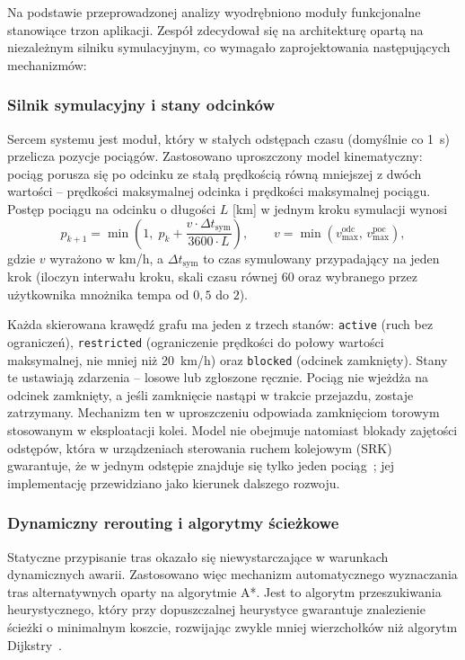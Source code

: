 \documentclass[twoside]{projektInzynierskiMS1z}
\begin{document}
Na podstawie przeprowadzonej analizy wyodrębniono moduły funkcjonalne stanowiące trzon
aplikacji. Zespół zdecydował się na architekturę opartą na niezależnym silniku
symulacyjnym, co wymagało zaprojektowania następujących mechanizmów:

\subsubsection{Silnik symulacyjny i stany odcinków}

Sercem systemu jest moduł, który w stałych odstępach czasu (domyślnie co 1~s)
przelicza pozycje pociągów. Zastosowano uproszczony model kinematyczny: pociąg
porusza się po odcinku ze stałą prędkością równą mniejszej z dwóch wartości --
prędkości maksymalnej odcinka i prędkości maksymalnej pociągu. Postęp pociągu na
odcinku o długości $L$ [km] w jednym kroku symulacji wynosi
\begin{equation}
p_{k+1} = \min\left(1,\; p_k + \frac{v \cdot \Delta t_{\mathrm{sym}}}{3600 \cdot L}\right),
\qquad v = \min\left(v^{\mathrm{odc}}_{\max},\, v^{\mathrm{poc}}_{\max}\right),
\end{equation}
gdzie $v$ wyrażono w km/h, a $\Delta t_{\mathrm{sym}}$ to czas symulowany
przypadający na jeden krok (iloczyn interwału kroku, skali czasu równej 60 oraz
wybranego przez użytkownika mnożnika tempa od $0{,}5$ do $2$).

Każda skierowana krawędź grafu ma jeden z trzech stanów: \texttt{active} (ruch
bez ograniczeń), \texttt{restricted} (ograniczenie prędkości do połowy wartości
maksymalnej, nie mniej niż 20~km/h) oraz \texttt{blocked} (odcinek zamknięty).
Stany te ustawiają zdarzenia -- losowe lub zgłoszone ręcznie. Pociąg nie wjeżdża
na odcinek zamknięty, a jeśli zamknięcie nastąpi w trakcie przejazdu, zostaje
zatrzymany. Mechanizm ten w uproszczeniu odpowiada zamknięciom torowym stosowanym
w eksploatacji kolei. Model nie obejmuje natomiast blokady zajętości odstępów,
która w urządzeniach sterowania ruchem kolejowym (SRK) gwarantuje, że w jednym
odstępie znajduje się tylko jeden pociąg~\cite{srk}; jej implementację
przewidziano jako kierunek dalszego rozwoju.

\subsubsection{Dynamiczny rerouting i algorytmy ścieżkowe}

Statyczne przypisanie tras okazało się niewystarczające w warunkach dynamicznych
awarii. Zastosowano więc mechanizm automatycznego wyznaczania tras alternatywnych
oparty na algorytmie A*. Jest to algorytm przeszukiwania heurystycznego, który
przy dopuszczalnej heurystyce gwarantuje znalezienie ścieżki o minimalnym koszcie,
rozwijając zwykle mniej wierzchołków niż algorytm Dijkstry~\cite{astar1968}.
\end{document}
